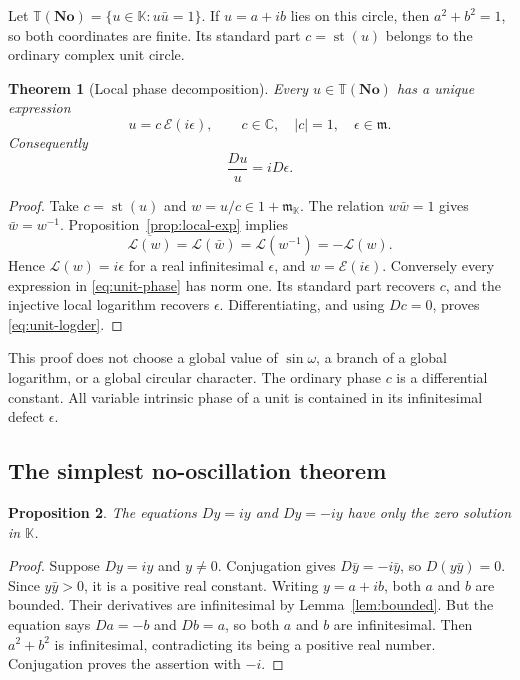 \documentclass[11pt,a4paper]{article}
\numberwithin{equation}{section}
\newtheorem{theorem}{Theorem}[section]
\newtheorem{proposition}[theorem]{Proposition}
\theoremstyle{definition}
\theoremstyle{remark}
\newcommand{\No}{\mathbf{No}}
\newcommand{\K}{\mathbb K}
\newcommand{\C}{\mathbb C}
\newcommand{\mm}{\mathfrak m}
\newcommand{\EE}{\mathcal E}
\newcommand{\LL}{\mathcal L}
\newcommand{\st}{\operatorname{st}}
\newcommand{\abs}[1]{\lvert #1\rvert}
\newcommand{\Torus}{\mathbb T}
\begin{document}
Let $\Torus(\No)=\{u\in\K:u\bar u=1\}$. If $u=a+ib$ lies on this
circle, then $a^2+b^2=1$, so both coordinates are finite. Its standard part
$c=\st(u)$ belongs to the ordinary complex unit circle.

\begin{theorem}[Local phase decomposition]\label{thm:unit-phase}
Every $u\in\Torus(\No)$ has a unique expression
\begin{equation}\label{eq:unit-phase}
 u=c\,\EE(i\epsilon),\qquad
 c\in\C,\quad\abs c=1,\quad\epsilon\in\mm.
\end{equation}
Consequently
\begin{equation}\label{eq:unit-logder}
 \frac{Du}{u}=iD\epsilon.
\end{equation}
\end{theorem}
\begin{proof}
Take $c=\st(u)$ and $w=u/c\in1+\mm_\K$. The relation $w\bar w=1$
gives $\bar w=w^{-1}$. Proposition~\ref{prop:local-exp} implies
\[
 \overline{\LL(w)}=\LL(\bar w)=\LL(w^{-1})=-\LL(w).
\]
Hence $\LL(w)=i\epsilon$ for a real infinitesimal $\epsilon$, and
$w=\EE(i\epsilon)$. Conversely every expression in \eqref{eq:unit-phase}
has norm one. Its standard part recovers $c$, and the injective local
logarithm recovers $\epsilon$. Differentiating, and using $Dc=0$, proves
\eqref{eq:unit-logder}.
\end{proof}

This proof does not choose a global value of $\sin\omega$, a branch of a
global logarithm, or a global circular character. The ordinary phase $c$
is a differential constant. All variable intrinsic phase of a unit is
contained in its infinitesimal defect $\epsilon$.

\subsection{The simplest no-oscillation theorem}

\begin{proposition}\label{prop:no-oscillation}
The equations $Dy=iy$ and $Dy=-iy$ have only the zero solution in $\K$.
\end{proposition}
\begin{proof}
Suppose $Dy=iy$ and $y\ne0$. Conjugation gives $D\bar y=-i\bar y$, so
$D(y\bar y)=0$. Since $y\bar y>0$, it is a positive real constant.
Writing $y=a+ib$, both $a$ and $b$ are bounded. Their derivatives are
infinitesimal by Lemma~\ref{lem:bounded}. But the equation says
$Da=-b$ and $Db=a$, so both $a$ and $b$ are infinitesimal. Then
$a^2+b^2$ is infinitesimal, contradicting its being a positive real number.
Conjugation proves the assertion with $-i$.
\end{proof}
\end{document}
